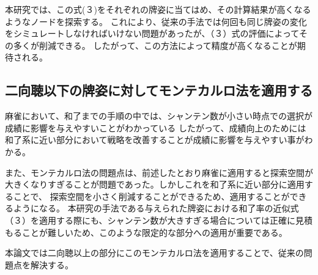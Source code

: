 本研究では、この式(３)をそれぞれの牌姿に当てはめ、その計算結果が高くなるようなノードを探索する。
これにより、従来の手法では何回も同じ牌姿の変化をシミュレートしなければいけない問題があったが、（３）式の評価によってその多くが削減できる。
したがって、この方法によって精度が高くなることが期待される。

\subsection{二向聴以下の牌姿に対してモンテカルロ法を適用する}

麻雀において、和了までの手順の中では、シャンテン数が小さい時点での選択が成績に影響を与えやすいことがわかっている\cite{gendai}
したがって、成績向上のためには和了系に近い部分において戦略を改善することが成績に影響を与えやすい事がわかる。

また、モンテカルロ法の問題点は、前述したとおり麻雀に適用すると探索空間が大きくなりすぎることが問題であった。しかしこれを和了系に近い部分に適用することで、
探索空間を小さく削減することができるため、適用することができるようになる。
本研究の手法である与えられた牌姿における和了率の近似式（３）を適用する際にも、シャンテン数が大きすぎる場合については正確に見積もることが難しいため、このような限定的な部分への適用が重要である。

本論文では二向聴以上の部分にこのモンテカルロ法を適用することで、従来の問題点を解決する。
